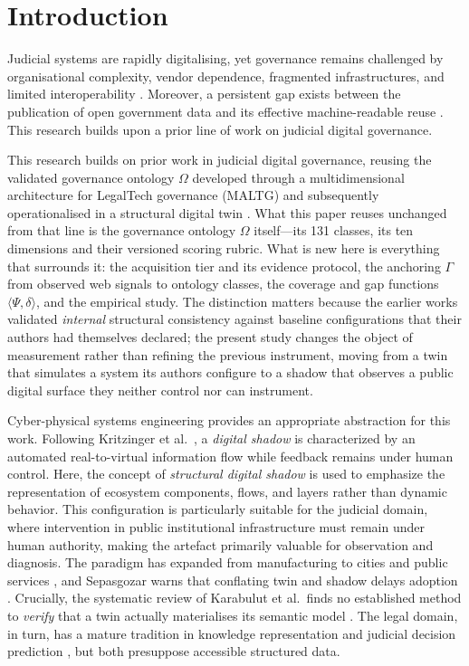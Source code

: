 \documentclass[engproc,proceedingpaper,submit,moreauthors]{Definitions/mdpi}
\begin{document}
\section{Introduction}
\label{sec:intro}
    Judicial systems are rapidly digitalising, yet governance remains challenged by organisational complexity, vendor dependence, fragmented infrastructures, and limited interoperability \cite{Rosa2013}. Moreover, a persistent gap exists between the publication of open government data and its effective machine-readable reuse \cite{Janssen2012,Attard2015}.
    This research builds upon a prior line of work on judicial digital governance.
    
    This research builds on prior work in judicial digital governance, reusing the validated governance ontology $\Omega$ developed through a multidimensional architecture for LegalTech governance (MALTG) \cite{paccha2026architecture,DeHaes2013} and subsequently operationalised in a structural digital twin \cite{Paccha2026SDT}.
    What this paper reuses unchanged from that line is the governance ontology $\Omega$ itself---its 131 classes, its ten dimensions and their versioned scoring rubric. What is new here is everything that surrounds it: the acquisition tier and its evidence protocol, the anchoring $\Gamma$ from observed web signals to ontology classes, the coverage and gap functions $\langle\Psi,\delta\rangle$, and the empirical study. The distinction matters because the earlier works validated \emph{internal} structural consistency against baseline configurations that their authors had themselves declared; the present study changes the object of measurement rather than refining the previous instrument, moving from a twin that simulates a system its authors configure to a shadow that observes a public digital surface they neither control nor can instrument.

    Cyber-physical systems engineering provides an appropriate abstraction for this work. Following Kritzinger et al.\ \cite{Kritzinger2018}, a \emph{digital shadow} is characterized by an automated real-to-virtual information flow while feedback remains under human control. Here, the concept of \emph{structural digital shadow} is used to emphasize the representation of ecosystem components, flows, and layers rather than dynamic behavior. This configuration is particularly suitable for the judicial domain, where intervention in public institutional infrastructure must remain under human authority, making the artefact primarily valuable for observation and diagnosis.
    The paradigm has expanded from manufacturing \cite{Tao2019} to cities and public services \cite{Shahat2021,Brauner2022}, and Sepasgozar warns that conflating twin and shadow delays adoption \cite{Sepasgozar2021}. Crucially, the systematic review of Karabulut et al.\ finds no established method to \emph{verify} that a twin actually materialises its semantic model \cite{Karabulut2024}. The legal domain, in turn, has a mature tradition in knowledge representation \cite{Casanovas2016} and judicial decision prediction \cite{Medvedeva2020}, but both presuppose accessible structured data.
\end{document}
